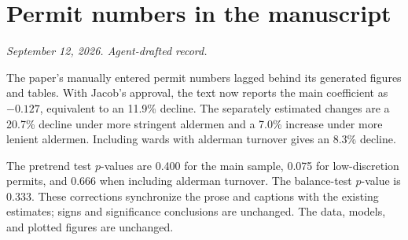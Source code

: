 \section*{Permit numbers in the manuscript}
\textit{September 12, 2026. Agent-drafted record.}

The paper's manually entered permit numbers lagged behind its generated
figures and tables. With Jacob's approval, the text now reports the main
coefficient as $-0.127$, equivalent to an 11.9\% decline. The separately
estimated changes are a 20.7\% decline under more stringent aldermen and a
7.0\% increase under more lenient aldermen. Including wards with alderman
turnover gives an 8.3\% decline.

The pretrend test $p$-values are 0.400 for the main sample, 0.075 for
low-discretion permits, and 0.666 when including alderman turnover. The
balance-test $p$-value is 0.333. These corrections synchronize the prose and
captions with the existing estimates; signs and significance conclusions are
unchanged. The data, models, and plotted figures are unchanged.
